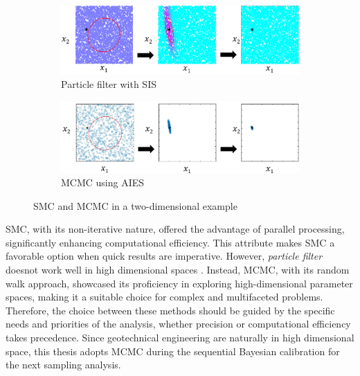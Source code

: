 \begin{figure}[ht]
\centering
\begin{subfigure}[htbp]{1.0\textwidth}
   \includegraphics[width=140mm]{Figures/figure-PFvsMCMC-SIS.pdf}
   \caption{Particle filter with \acrlong{SIS}}
   \label{fig: PFvsMCMC_1} 
\end{subfigure}

\begin{subfigure}[htbp]{1.0\textwidth}
   \includegraphics[width=140mm]{Figures/figure-PFvsMCMCAIES.pdf}
   \caption{\acrlong{MCMC} using \acrlong{AIES}}
   \label{fig: PFvsMCMC_2}
\end{subfigure}

\caption[Two sampling method]{\acrshort{SMC} and \acrshort{MCMC} in a two-dimensional example}
\end{figure}

SMC, with its non-iterative nature, offered the advantage of parallel processing, significantly enhancing computational efficiency. This attribute makes \acrshort{SMC} a favorable option when quick results are imperative. However, \textit{particle filter} doesnot work well in high dimensional spaces \citep{murphy2012}. Instead, \acrshort{MCMC}, with its random walk approach, showcased its proficiency in exploring high-dimensional parameter spaces, making it a suitable choice for complex and multifaceted problems. Therefore, the choice between these methods should be guided by the specific needs and priorities of the analysis, whether precision or computational efficiency takes precedence. Since geotechnical engineering are naturally in high dimensional space, this thesis adopts \acrshort{MCMC} during the sequential Bayesian calibration for the next sampling analysis.



